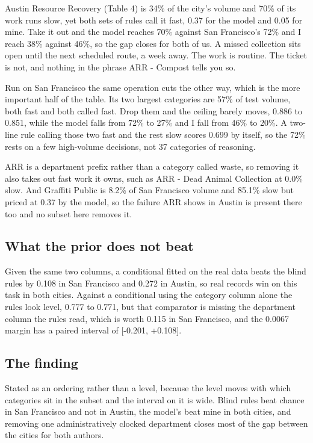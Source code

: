 \documentclass[10pt,a4paper,twocolumn]{article}
\begin{document}
Austin Resource Recovery (Table 4) is 34\% of the city's volume and 70\% of its
work runs slow, yet both sets of rules call it fast, 0.37 for the model and 0.05
for mine. Take it out and the model reaches 70\% against San Francisco's 72\% and I
reach 38\% against 46\%, so the gap closes for both of us. A missed collection sits
open until the next scheduled route, a week away. The work is routine. The ticket
is not, and nothing in the phrase ARR - Compost tells you so.

Run on San Francisco the same operation cuts the other way, which is the more
important half of the table. Its two largest categories are 57\% of test volume,
both fast and both called fast. Drop them and the ceiling barely moves, 0.886 to
0.851, while the model falls from 72\% to 27\% and I fall from 46\% to 20\%. A
two-line rule calling those two fast and the rest slow scores 0.699 by itself, so
the 72\% rests on a few high-volume decisions, not 37 categories of reasoning.

ARR is a department prefix rather than a category called waste, so removing it
also takes out fast work it owns, such as ARR - Dead Animal Collection at 0.0\%
slow. And Graffiti Public is 8.2\% of San Francisco volume and 85.1\% slow but
priced at 0.37 by the model, so the failure ARR shows in Austin is present there
too and no subset here removes it.

\subsection*{What the prior does not beat}

Given the same two columns, a conditional fitted on the real data beats the blind
rules by 0.108 in San Francisco and 0.272 in Austin, so real records win on this
task in both cities. Against a conditional using the category column alone the
rules look level, 0.777 to 0.771, but that comparator is missing the department
column the rules read, which is worth 0.115 in San Francisco, and the 0.0067
margin has a paired interval of [-0.201, +0.108].

\subsection*{The finding}

Stated as an ordering rather than a level, because the level moves with which
categories sit in the subset and the interval on it is wide. Blind rules beat
chance in San Francisco and not in Austin, the model's beat mine in both cities,
and removing one administratively clocked department closes most of the gap
between the cities for both authors.
\end{document}
